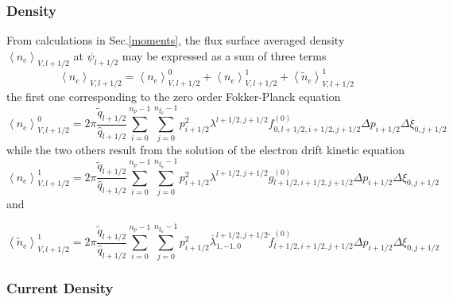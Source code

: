 
\subsubsection{Density}

From calculations in Sec.\ref{moments}, the flux surface averaged density
$\left\langle n_{e}\right\rangle _{V,l+1/2}$ at $\psi_{l+1/2}$ may be
expressed as a sum of three terms
\[
\left\langle n_{e}\right\rangle _{V,l+1/2}=\left\langle n_{e}\right\rangle
_{V,l+1/2}^{0}+\left\langle n_{e}\right\rangle _{V,l+1/2}^{1}+\left\langle
\widetilde{n}_{e}\right\rangle _{V,l+1/2}^{1}
\]
the first one corresponding to the zero order Fokker-Planck equation
\begin{equation}
\left\langle n_{e}\right\rangle _{V,l+1/2}^{0}=2\pi\frac{\widetilde{q}%
_{l+1/2}}{\widehat{q}_{l+1/2}}\sum_{i=0}^{n_{p}-1}\sum_{j=0}^{n_{\xi_{0}}%
-1}p_{i+1/2}^{2}\lambda^{l+1/2,j+1/2}f_{0,l+1/2,i+1/2,j+1/2}^{(0)}\Delta
p_{i+1/2}\Delta\xi_{0,j+1/2}%
\end{equation}
while the two others result from the solution of the electron drift kinetic
equation
\begin{equation}
\left\langle n_{e}\right\rangle _{V,l+1/2}^{1}=2\pi\frac{\widetilde{q}%
_{l+1/2}}{\widehat{q}_{l+1/2}}\sum_{i=0}^{n_{p}-1}\sum_{j=0}^{n_{\xi_{0}}%
-1}p_{i+1/2}^{2}\lambda^{l+1/2,j+1/2}g_{l+1/2,i+1/2,j+1/2}^{(0)}\Delta
p_{i+1/2}\Delta\xi_{0,j+1/2}%
\end{equation}
and%

\begin{equation}
\left\langle \widetilde{n}_{e}\right\rangle _{V,l+1/2}^{1}=2\pi\frac
{\widetilde{q}_{l+1/2}}{\widehat{q}_{l+1/2}}\sum_{i=0}^{n_{p}-1}\sum
_{j=0}^{n_{\xi_{0}}-1}p_{i+1/2}^{2}\overline{\lambda}_{1,-1,0}^{l+1/2,j+1/2}%
\widetilde{f}_{l+1/2,i+1/2,j+1/2}^{(0)}\Delta p_{i+1/2}\Delta\xi_{0,j+1/2}%
\end{equation}

\subsubsection{Current Density}

